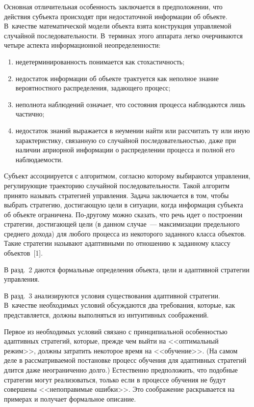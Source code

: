 \begin{multicols}{2}
  Основная отличительная особенность заключается в предположении, что действия 
субъекта происходят при недостаточной информации об объекте. В~качестве 
математической модели объекта взята конструкция управляемой случайной 
последовательности. В~терминах этого аппарата легко очерчиваются четыре аспекта 
информационной неопределенности:
  \begin{enumerate}[(1)]
\item недетерминированность понимается как стохастичность;
\item недостаток информации об объекте трактуется как неполное знание вероятностного 
распределения, задающего процесс;
  \item неполнота наблюдений означает, что состояния процесса наблюдаются лишь 
частично;
  \item недостаток знаний выражается в неумении \mbox{найти} или рассчитать ту или иную 
характеристику, связанную со случайной последовательностью, даже при наличии 
априорной информации о распределении процесса и полной его наблюдаемости.
  \end{enumerate}
  
  Субъект ассоциируется с алгоритмом, согласно которому выбираются управления, 
регулирующие траекторию случайной последовательности. Такой алгоритм принято 
называть стратегией управ\-ле\-ния. Задача заключается в том, чтобы выбрать стратегию, 
достигающую цели в ситуации, когда информация субъекта об объекте ограничена. 
По-дру\-го\-му можно сказать, что речь идет о построении стратегии, достигающей цели (в 
данном случае~--- максимизации предельного среднего дохода) для любого процесса из 
некоторого заданного класса объектов. Такие стратегии называют адаптивными по 
отношению к заданному классу объектов~[1].
  
  В разд.~2 даются формальные определения объекта, цели и адаптивной стратегии 
управления.
  
  В разд.~3 анализируются условия существования адаптивной стратегии. В~качестве 
необходимых условий обсуждаются два требования, которые, как представляется, должны 
выполняться из интуитивных соображений.
  
  Первое из необходимых условий связано с принципиальной особенностью адаптивных 
стратегий, которые, прежде чем выйти на <<оптимальный режим>>, должны затратить 
некоторое время на <<обуче\-ние>>. (На самом деле в рассматриваемой постановке процесс 
обучения для адаптивных стратегий длится даже неограниченно долго.) Естественно 
предположить, что подобные стратегии могут реализоваться, только если в процессе 
обучения не будут совершены <<непоправимые ошибки>>. Это соображение 
раскрывается на примерах и получает формальное описание.
  

\end{multicols}
